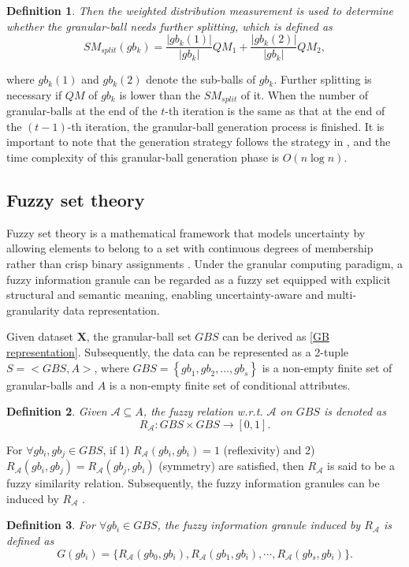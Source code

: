 \documentclass[times, review, 10pt]{elsarticle}
\newtheorem{definition}{Definition}
\begin{document}
\begin{definition}
Then the weighted distribution measurement is used to determine whether the granular-ball needs further splitting, which is defined as
\begin{equation}
{
SM_{split}(gb_k)=\frac{\left|gb_k(1)\right|}{|gb_k|} QM_1+\frac{\left|gb_k(2)\right|}{|gb_k|} QM_2,}
\label{eq:split critirion}
\end{equation}
\end{definition}
{where $gb_k(1)$ and $gb_k(2)$ denote the sub-balls of $gb_k$.} Further splitting is necessary if $QM$ of $gb_k$ is lower than the $SM_{split}$ of it. When the number of granular-balls at the end of the $t$-th iteration is the same as that at the end of the $(t-1)$-th iteration, the granular-ball generation process is finished. 
{It is important to note that the generation strategy follows the strategy in \cite{xie2023efficient}, and the time complexity of this granular-ball generation phase is $O(n \log n)$.}


\subsection{Fuzzy set theory}
{
Fuzzy set theory is a mathematical framework that models uncertainty by allowing elements to belong to a set with continuous degrees of membership rather than crisp binary assignments \cite{chen2025label}.
Under the granular computing paradigm, a fuzzy information granule can be regarded as a fuzzy set equipped with explicit structural and semantic meaning, enabling uncertainty-aware and multi-granularity data representation.
}

{
Given dataset $\boldsymbol{X}$, the granular-ball set $GBS$ can be derived as \ref{GB representation}. Subsequently, the data can be represented as a 2-tuple $S = <GBS, A>$, where $GBS=\left\{{gb}_1,{gb}_2, \ldots, {gb}_{{s}}\right\}$ is a non-empty finite set of granular-balls and $A$ is a non-empty finite set of conditional attributes.
\begin{definition}
    Given $\mathcal{A} \subseteq A$, the fuzzy relation w.r.t. $\mathcal{A}$ on $GBS$ is denoted as
    \begin{equation}
        R_{\mathcal{A}}: GBS\times GBS \rightarrow [0,1].
    \end{equation}
\end{definition}
}

{
For $\forall gb_{i}, gb_{j} \in GBS$, if 1) $R_{\mathcal{A}}(gb_{i},gb_{i})=1$ (reflexivity) and 2) $R_{\mathcal{A}}(gb_{i},gb_{j})=R_{\mathcal{A}}(gb_{j},gb_{i})$ (symmetry) are satisfied, then $R_{\mathcal{A}}$ is said to be a fuzzy similarity relation. 
Subsequently, the fuzzy information granules can be induced by $R_{\mathcal{A}}$ \cite{wang2025granular}. 
\begin{definition}
    For $\forall gb_{i} \in GBS$, the fuzzy information granule induced by $R_{\mathcal{A}}$ is defined as
\begin{equation}
    G(gb_{i}) = \{R_{\mathcal{A}}(gb_{0},gb_{i}), R_{\mathcal{A}}(gb_{1},gb_{i}),\cdots,R_{\mathcal{A}}(gb_{s},gb_{i})\}.
\end{equation}
\end{definition}
}
\end{document}
